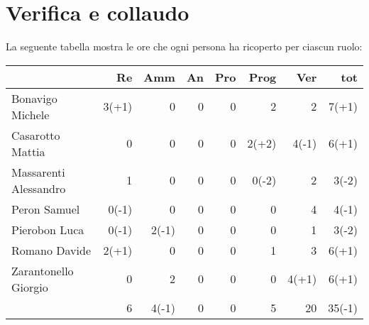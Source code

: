 \section{Verifica e collaudo}


La seguente tabella mostra le ore che ogni persona ha ricoperto per ciascun ruolo:
\begin{table}[ht]
    \begin{tabularx}{\linewidth}{X|rrrrrrr}
    \rowcolor{gray!30}& Re & Amm & An & Pro & Prog & Ver & tot \\
    \hline
    Bonavigo Michele                        & 3(+1)    & 0          & 0       & 0     & 2       & 2       & 7(+1) \\

    \rowcolor{gray!10}Casarotto Mattia      & 0        & 0          & 0       & 0     & 2(+2)   & 4(-1)   & 6(+1) \\

    Massarenti Alessandro                   & 1        & 0          & 0       & 0     & 0(-2)   & 2       & 3(-2) \\ 

    \rowcolor{gray!10}Peron Samuel          & 0(-1)    & 0          & 0       & 0     & 0       & 4       & 4(-1) \\ 

    Pierobon Luca                           & 0(-1)    & 2(-1)      & 0       & 0     & 0       & 1       & 3(-2) \\ 

    \rowcolor{gray!10}Romano Davide         & 2(+1)    & 0          & 0       & 0     & 1       & 3       & 6(+1)\\

    Zarantonello Giorgio                    & 0        & 2          & 0       & 0     & 0       & 4(+1)   & 6(+1)\\

    \hline                                  & 6        & 4(-1)      & 0       & 0     & 5       & 20      & 35(-1)\\  
    \end{tabularx}
\end{table}

